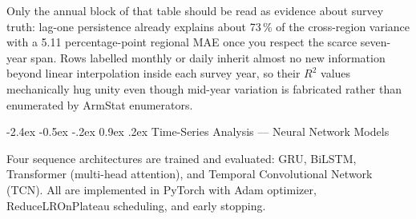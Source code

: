 \documentclass[12pt]{article}
\makeatletter
\renewcommand\subsection{%
  \@startsection{subsection}{2}{\z@}%
    {-2.4ex \@plus -0.5ex \@minus -.2ex}%
    {0.9ex \@plus .2ex}%
    {\color{steelblue}\normalsize\bfseries}}
\makeatother
\begin{document}
\vspace{0.35em}
\noindent
Only the annual block of that table should be read as evidence about survey truth: lag-one persistence already explains about 73\,\% of the cross-region variance with a 5.11 percentage-point regional MAE once you respect the scarce seven-year span. Rows labelled monthly or daily inherit almost no new information beyond linear interpolation inside each survey year, so their $R^2$ values mechanically hug unity even though mid-year variation is fabricated rather than enumerated by ArmStat enumerators.

\subsection{Time-Series Analysis --- Neural Network Models}

\indent\hspace*{1em}
Four sequence architectures are trained and evaluated: GRU, BiLSTM,
Transformer (multi-head attention), and Temporal Convolutional Network (TCN).
All are implemented in PyTorch with Adam optimizer, ReduceLROnPlateau scheduling,
and early stopping.
\end{document}

